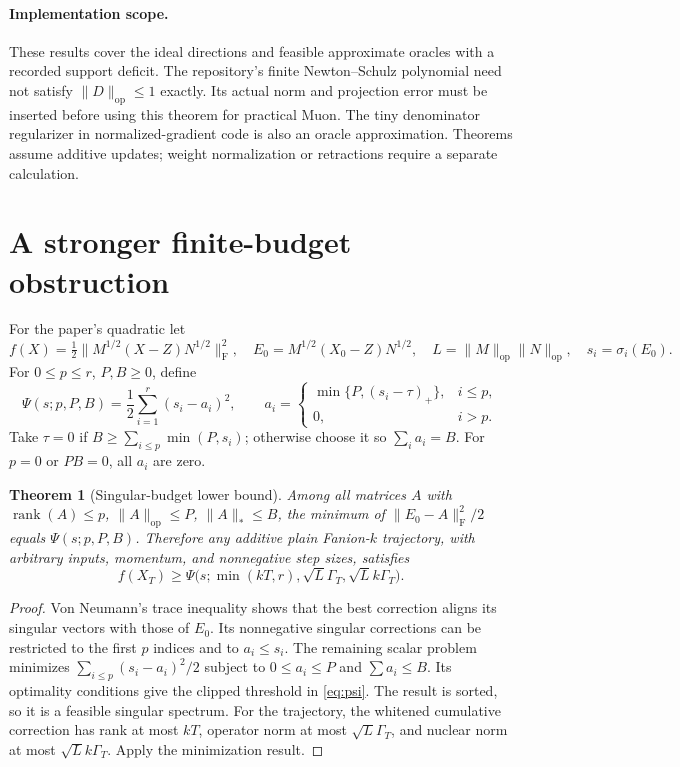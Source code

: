 \documentclass[11pt]{article}
\newtheorem{theorem}{Theorem}[section]
\newcommand{\F}[1]{\lVert #1\rVert_{\mathrm F}}
\newcommand{\nuc}[1]{\lVert #1\rVert_*}
\newcommand{\op}[1]{\lVert #1\rVert_{\mathrm{op}}}
\newcommand{\rank}{\operatorname{rank}}
\begin{document}
\paragraph{Implementation scope.}
These results cover the ideal directions and feasible approximate oracles
with a recorded support deficit. The repository's finite Newton--Schulz
polynomial need not satisfy $\op{D}\leq1$ exactly. Its actual norm and
projection error must be inserted before using this theorem for practical
Muon. The tiny denominator regularizer in normalized-gradient code is also
an oracle approximation. Theorems assume additive updates; weight
normalization or retractions require a separate calculation.

\section{A stronger finite-budget obstruction}\label{sec:budget}

For the paper's quadratic let
\[
 f(X)=\tfrac12\F{M^{1/2}(X-Z)N^{1/2}}^2,\quad
 E_0=M^{1/2}(X_0-Z)N^{1/2},\quad
 L=\op{M}\op{N},\quad s_i=\sigma_i(E_0).
\]
For $0\leq p\leq r$, $P,B\geq0$, define
\begin{equation}\label{eq:psi}
 \Psi(s;p,P,B)=\frac12\sum_{i=1}^r(s_i-a_i)^2,\qquad
 a_i=\begin{cases}
 \min\{P,(s_i-\tau)_+\},&i\leq p,\\0,&i>p.
 \end{cases}
\end{equation}
Take $\tau=0$ if $B\geq\sum_{i\leq p}\min(P,s_i)$; otherwise choose it
so $\sum_i a_i=B$. For $p=0$ or $P B=0$, all $a_i$ are zero.

\begin{theorem}[Singular-budget lower bound]\label{thm:waterfill}
Among all matrices $A$ with
$\rank(A)\leq p$, $\op{A}\leq P$, $\nuc{A}\leq B$, the minimum of
$\F{E_0-A}^2/2$ equals $\Psi(s;p,P,B)$.
Therefore any additive plain Fanion-$k$ trajectory, with arbitrary inputs,
momentum, and nonnegative step sizes, satisfies
\begin{equation}\label{eq:plainbarrier}
 f(X_T)\geq
 \Psi\bigl(s;\min(kT,r),\sqrt L\Gamma_T,\sqrt L k\Gamma_T\bigr).
\end{equation}
\end{theorem}

\begin{proof}
Von Neumann's trace inequality shows that the best correction aligns its
singular vectors with those of $E_0$. Its nonnegative singular corrections
can be restricted to the first $p$ indices and to $a_i\leq s_i$.
The remaining scalar problem minimizes $\sum_{i\leq p}(s_i-a_i)^2/2$
subject to $0\leq a_i\leq P$ and $\sum a_i\leq B$.
Its optimality conditions give the clipped threshold in \eqref{eq:psi}.
The result is sorted, so it is a feasible singular spectrum.
For the trajectory, the whitened cumulative correction has rank at most
$kT$, operator norm at most $\sqrt L\Gamma_T$, and nuclear norm at most
$\sqrt L k\Gamma_T$. Apply the minimization result.
\end{proof}
\end{document}
